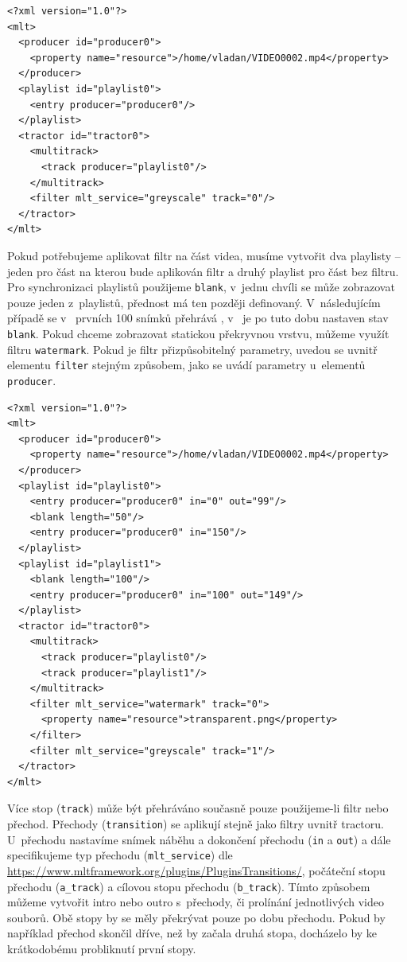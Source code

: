 \begin{lstlisting}[style=xml]
<?xml version="1.0"?>
<mlt>
  <producer id="producer0">
    <property name="resource">/home/vladan/VIDEO0002.mp4</property>
  </producer>
  <playlist id="playlist0">
    <entry producer="producer0"/>
  </playlist>
  <tractor id="tractor0">
    <multitrack>
      <track producer="playlist0"/>
    </multitrack>
    <filter mlt_service="greyscale" track="0"/>
  </tractor>
</mlt>
\end{lstlisting}
Pokud potřebujeme aplikovat filtr na část videa, musíme vytvořit dva playlisty -- jeden pro část na kterou bude aplikován filtr a druhý playlist pro část bez filtru. Pro synchronizaci playlistů použijeme \texttt{blank}, v~jednu chvíli se může zobrazovat pouze jeden z~playlistů, přednost má ten později definovaný. V~následujícím případě se v~ prvních 100 snímků přehrává , v~ je po tuto dobu nastaven stav \texttt{blank}. Pokud chceme zobrazovat statickou překryvnou vrstvu, můžeme využít filtru \texttt{watermark}. Pokud je filtr přizpůsobitelný parametry, uvedou se uvnitř elementu \texttt{filter} stejným způsobem, jako se uvádí parametry u~elementů \texttt{producer}.
\begin{lstlisting}[style=xml]
<?xml version="1.0"?>
<mlt>
  <producer id="producer0">
    <property name="resource">/home/vladan/VIDEO0002.mp4</property>
  </producer>
  <playlist id="playlist0">
    <entry producer="producer0" in="0" out="99"/>
    <blank length="50"/>
    <entry producer="producer0" in="150"/>
  </playlist>
  <playlist id="playlist1">
    <blank length="100"/>
    <entry producer="producer0" in="100" out="149"/>
  </playlist>
  <tractor id="tractor0">
    <multitrack>
      <track producer="playlist0"/>
      <track producer="playlist1"/>
    </multitrack>
    <filter mlt_service="watermark" track="0">
      <property name="resource">transparent.png</property>
    </filter>
    <filter mlt_service="greyscale" track="1"/>
  </tractor>
</mlt>
\end{lstlisting}
Více stop (\texttt{track}) může být přehráváno současně pouze použijeme-li filtr nebo přechod. Přechody (\texttt{transition}) se aplikují stejně jako filtry uvnitř tractoru. U~přechodu nastavíme snímek náběhu a dokončení přechodu (\texttt{in} a \texttt{out}) a dále specifikujeme typ přechodu (\texttt{mlt\_service}) dle \url{https://www.mltframework.org/plugins/PluginsTransitions/}, počáteční stopu přechodu (\texttt{a\_track}) a cílovou stopu přechodu (\texttt{b\_track}). Tímto způsobem můžeme vytvořit intro nebo outro s~přechody, či prolínání jednotlivých video souborů. Obě stopy by se měly překrývat pouze po dobu přechodu. Pokud by například přechod skončil dříve, než by začala druhá stopa, docházelo by ke krátkodobému probliknutí první stopy.
